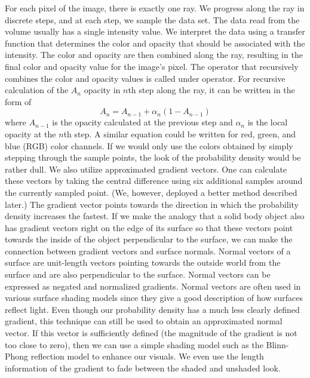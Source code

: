 For each pixel of the image, there is exactly one ray.
We progress along the ray in discrete steps, and at each step, we sample the data set.
The data read from the volume usually has a single intensity value.
We interpret the data using a transfer function that determines the color and opacity that should be associated with the intensity.
The color and opacity are then combined along the ray, resulting in the final color and opacity value for the image's pixel.
The operator that recursively combines the color and opacity values is called under operator. For recursive calculation of the $A_n$ opacity in $n$th step along the ray, it can be written in the form of
\begin{equation}
	\label{eq:under_op}
	A_n = A_{n-1} + \alpha_n(1 - A_{n-1})
\end{equation}
where $A_{n-1}$ is the opacity calculated at the previous step and $\alpha_n$ is the local opacity at the $n$th step.
A similar equation could be written for red, green, and blue (RGB) color channels.
If we would only use the colors obtained by simply stepping through the sample points, the look of the probability density would be rather dull.
We also utilize approximated gradient vectors.
One can calculate these vectors by taking the central difference using six additional samples around the currently sampled point.
(We, however, deployed a better method described later.)
The gradient vector points towards the direction in which the probability density increases the fastest.
If we make the analogy that a solid body object also has gradient vectors right on the edge of its surface so that these vectors point towards the inside of the object perpendicular to the surface,
we can make the connection between gradient vectors and surface normals.
Normal vectors of a surface are unit-length vectors pointing towards the outside world from the surface and are also perpendicular to the surface.
Normal vectors can be expressed as negated and normalized gradients.
Normal vectors are often used in various surface shading models since they give a good description of how surfaces reflect light.
Even though our probability density has a much less clearly defined gradient, this technique can still be used to obtain an approximated normal vector.
If this vector is sufficiently defined (the magnitude of the gradient is not too close to zero), then we can use a simple shading model such as the Blinn-Phong reflection model \cite{Blinn1977} to enhance our visuals.
We even use the length information of the gradient to fade between the shaded and unshaded look.

